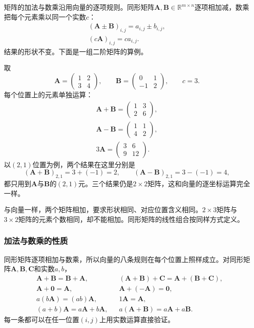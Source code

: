 矩阵的加法与数乘沿用向量的逐项规则。同形矩阵$\bm A,\bm B\in\mathbb R^{m\times n}$逐项相加减，数乘把每个元素乘以同一个实数$c$：
\begin{equation}
 \begin{gathered}
(\bm A\pm\bm B)_{i,j}=a_{i,j}\pm b_{i,j},\\
(c\bm A)_{i,j}=ca_{i,j}.
 \end{gathered}
 \label{eq:ls-matrix-addition-scaling}
\end{equation}
结果的形状不变。下面是一组二阶矩阵的算例。
\begin{example}
\label{ex:ls-matrix-addition-scaling}
取
\[
\bm A=\begin{pmatrix}1&2\\3&4\end{pmatrix},\qquad
\bm B=\begin{pmatrix}0&1\\-1&2\end{pmatrix},\qquad
c=3.
\]
每个位置上的元素单独运算：
\[
\begin{gathered}
\bm A+\bm B=\begin{pmatrix}1&3\\2&6\end{pmatrix},\\
\bm A-\bm B=\begin{pmatrix}1&1\\4&2\end{pmatrix},\\
3\bm A=\begin{pmatrix}3&6\\9&12\end{pmatrix}.
\end{gathered}
\]
以$(2,1)$位置为例，两个结果在这里分别是
\[
 (\bm A+\bm B)_{2,1}=3+(-1)=2,\qquad
 (\bm A-\bm B)_{2,1}=3-(-1)=4,
\]
都只用到$\bm A$与$\bm B$的$(2,1)$元。三个结果仍是$2\times2$矩阵，这和向量的逐坐标运算完全一样。
\end{example}
与向量一样，两个矩阵相加，要求形状相同、对应位置含义相同。$2\times3$矩阵与$3\times2$矩阵的元素个数相同，却不能相加。同形矩阵的线性组合按同样方式定义。

\subsubsection{加法与数乘的性质}
同形矩阵逐项相加与数乘，所以向量的八条规则在每个位置上照样成立。对同形矩阵$\bm A,\bm B,\bm C$和实数$a,b$，
\[
\begin{aligned}
 &\bm A+\bm B=\bm B+\bm A, && (\bm A+\bm B)+\bm C=\bm A+(\bm B+\bm C),\\
 &\bm A+\bm0=\bm A, && \bm A+(-\bm A)=\bm0,\\
 &a(b\bm A)=(ab)\bm A, && 1\bm A=\bm A,\\
 &(a+b)\bm A=a\bm A+b\bm A, && a(\bm A+\bm B)=a\bm A+a\bm B.
\end{aligned}
\]
每一条都可以在任一位置$(i,j)$上用实数运算直接验证。

